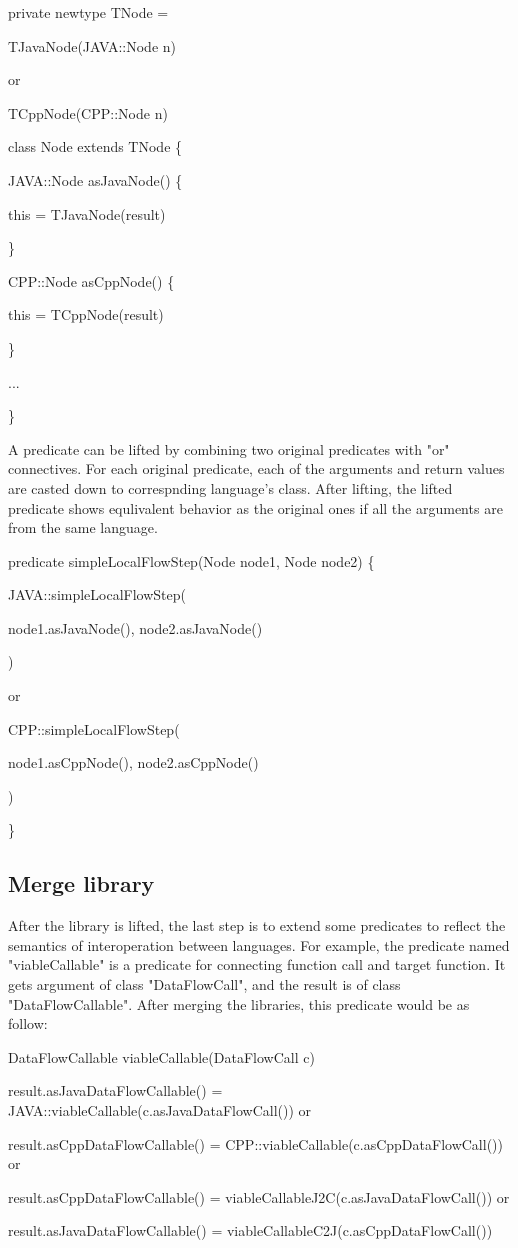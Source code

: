 private newtype TNode =

  TJavaNode(JAVA::Node n)
  
  or
  
  TCppNode(CPP::Node n)

class Node extends TNode \{
  
  JAVA::Node asJavaNode() \{
    
    this = TJavaNode(result)
  
  \}
  
  CPP::Node asCppNode() \{
    
    this = TCppNode(result)
  
  \}
  
  ...

\}

A predicate can be lifted by combining two original predicates with "or" connectives.
For each original predicate, each of the arguments and return values are casted down to
correspnding language's class. After lifting, the lifted predicate shows equlivalent behavior
as the original ones if all the arguments are from the same language.

predicate simpleLocalFlowStep(Node node1, Node node2) \{
  
  JAVA::simpleLocalFlowStep(
    
    node1.asJavaNode(), node2.asJavaNode()

  )
  
  or
  
  CPP::simpleLocalFlowStep(

    node1.asCppNode(), node2.asCppNode()

  )

\}

\subsection{Merge library}

After the library is lifted, the last step is to extend some predicates to reflect the
semantics of interoperation between languages. For example, the predicate named "viableCallable"
is a predicate for connecting function call and target function. It gets argument of class "DataFlowCall",
and the result is of class "DataFlowCallable". After merging the libraries, this predicate would be as follow:

DataFlowCallable viableCallable(DataFlowCall c) {

result.asJavaDataFlowCallable() = JAVA::viableCallable(c.asJavaDataFlowCall()) or

result.asCppDataFlowCallable() = CPP::viableCallable(c.asCppDataFlowCall()) or

result.asCppDataFlowCallable() = viableCallableJ2C(c.asJavaDataFlowCall()) or

result.asJavaDataFlowCallable() = viableCallableC2J(c.asCppDataFlowCall())

}

